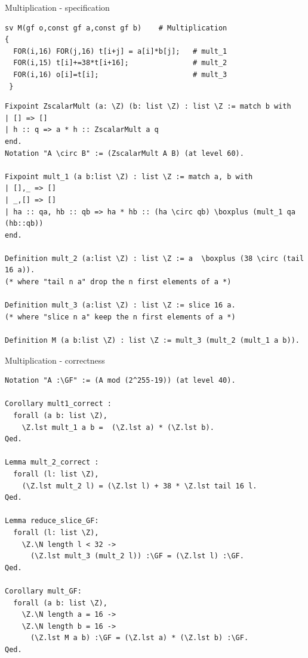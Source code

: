 \documentclass[8pt]{beamer}
\begin{document}
%
%

\begin{frame}[fragile]{Multiplication - specification}
  \begin{center}
\begin{lstlisting}[language=cnacl, caption=M, label=cod:languageC101]
sv M(gf o,const gf a,const gf b)    # Multiplication
{
  FOR(i,16) FOR(j,16) t[i+j] = a[i]*b[j];   # mult_1
  FOR(i,15) t[i]+=38*t[i+16];               # mult_2
  FOR(i,16) o[i]=t[i];                      # mult_3
 }
\end{lstlisting}

\begin{lstlisting}[language=CoqD, caption=Multiplication, label=cod:languageC102]
Fixpoint ZscalarMult (a: \Z) (b: list \Z) : list \Z := match b with
| [] => []
| h :: q => a * h :: ZscalarMult a q
end.
Notation "A \circ B" := (ZscalarMult A B) (at level 60).

Fixpoint mult_1 (a b:list \Z) : list \Z := match a, b with
| [],_ => []
| _,[] => []
| ha :: qa, hb :: qb => ha * hb :: (ha \circ qb) \boxplus (mult_1 qa (hb::qb))
end.

Definition mult_2 (a:list \Z) : list \Z := a  \boxplus (38 \circ (tail 16 a)).
(* where "tail n a" drop the n first elements of a *)

Definition mult_3 (a:list \Z) : list \Z := slice 16 a.
(* where "slice n a" keep the n first elements of a *)

Definition M (a b:list \Z) : list \Z := mult_3 (mult_2 (mult_1 a b)).
\end{lstlisting}

  \end{center}
\end{frame}

%
%

\begin{frame}[fragile]{Multiplication - correctness}
  \begin{center}
\begin{lstlisting}[language=CoqD, caption=Multiplication | proof of correctness, label=cod:languageC111]
Notation "A :\GF" := (A mod (2^255-19)) (at level 40).

Corollary mult1_correct :
  forall (a b: list \Z),
    \Z.lst mult_1 a b =  (\Z.lst a) * (\Z.lst b).
Qed.

Lemma mult_2_correct :
  forall (l: list \Z),
    (\Z.lst mult_2 l) = (\Z.lst l) + 38 * \Z.lst tail 16 l.
Qed.

Lemma reduce_slice_GF:
  forall (l: list \Z),
    \Z.\N length l < 32 ->
      (\Z.lst mult_3 (mult_2 l)) :\GF = (\Z.lst l) :\GF.
Qed.

Corollary mult_GF:
  forall (a b: list \Z),
    \Z.\N length a = 16 ->
    \Z.\N length b = 16 ->
      (\Z.lst M a b) :\GF = (\Z.lst a) * (\Z.lst b) :\GF.
Qed.
\end{lstlisting}

  \end{center}
\end{frame}
\end{document}
